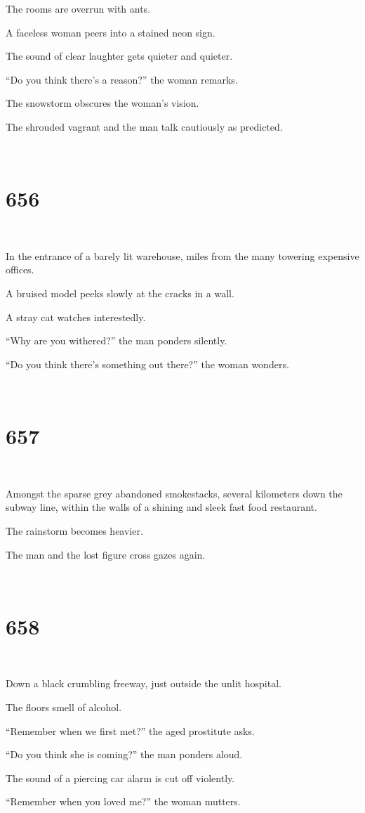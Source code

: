 \documentclass{report}
\begin{document}
The rooms are overrun with ants.

A faceless woman peers into a stained neon sign.

The sound of clear laughter gets quieter and quieter.

``Do you think there's a reason?'' the woman remarks.

The snowstorm obscures the woman's vision.

The shrouded vagrant and the man talk cautiously as predicted.

~
\chapter*{656}
~

In the entrance of a barely lit warehouse, miles from the many towering expensive offices.

A bruised model peeks slowly at the cracks in a wall.

A stray cat watches interestedly.

``Why are you withered?'' the man ponders silently.

``Do you think there's something out there?'' the woman wonders.

~
\chapter*{657}
~

Amongst the sparse grey abandoned smokestacks, several kilometers down the subway line, within the walls of a shining and sleek fast food restaurant.

The rainstorm becomes heavier.

The man and the lost figure cross gazes again.

~
\chapter*{658}
~

Down a black crumbling freeway, just outside the unlit hospital.

The floors smell of alcohol.

``Remember when we first met?'' the aged prostitute asks.

``Do you think she is coming?'' the man ponders aloud.

The sound of a piercing car alarm is cut off violently.

``Remember when you loved me?'' the woman mutters.
\end{document}
